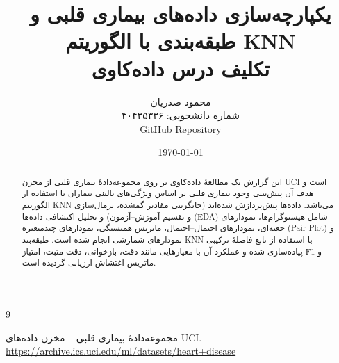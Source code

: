 \documentclass[12pt,a4paper]{article}
\title{
	یکپارچه‌سازی داده‌های بیماری قلبی و طبقه‌بندی با الگوریتم KNN\\
	{\large تکلیف درس داده‌کاوی}
}
\author{
	محمود صدریان\\
	شماره دانشجویی: ۴۰۴۳۵۳۳۶\\[6pt]
	\href{https://github.com/mahmoud-sadrian/heart-disease_KNN_classifier/}{GitHub Repository}
}
\date{\today}
\begin{document}
	
	\maketitle
	
	\begin{abstract}
		این گزارش یک مطالعهٔ داده‌کاوی بر روی مجموعه‌دادهٔ بیماری قلبی از مخزن UCI است و هدف آن پیش‌بینی وجود بیماری قلبی بر اساس ویژگی‌های بالینی بیماران با استفاده از الگوریتم KNN می‌باشد. داده‌ها پیش‌پردازش شده‌اند (جایگزینی مقادیر گمشده، نرمال‌سازی و تقسیم آموزش–آزمون) و تحلیل اکتشافی داده‌ها (EDA) شامل هیستوگرام‌ها، نمودارهای جعبه‌ای، نمودارهای احتمال–احتمال، ماتریس همبستگی، نمودارهای چندمتغیره (Pair Plot) و نمودارهای شمارشی انجام شده است. طبقه‌بند KNN با استفاده از تابع فاصلهٔ ترکیبی پیاده‌سازی شده و عملکرد آن با معیارهایی مانند دقت، بازخوانی، دقت مثبت، امتیاز F1 و ماتریس اغتشاش ارزیابی گردیده است.
	\end{abstract}
	
	
	
	
	
	
	
	
	\begin{thebibliography}{9}
		
		مجموعه‌دادهٔ بیماری قلبی – مخزن داده‌های UCI.\\
		\url{https://archive.ics.uci.edu/ml/datasets/heart+disease}
		
	\end{thebibliography}
	
\end{document}
